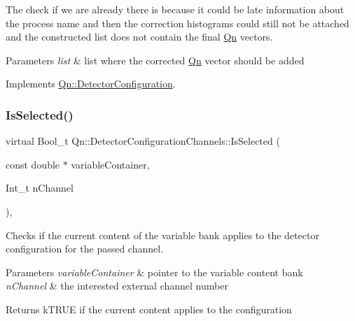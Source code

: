The check if we are already there is because it could be late information about the process name and then the correction histograms could still not be attached and the constructed list does not contain the final \mbox{\hyperlink{namespaceQn}{Qn}} vectors. 
\begin{DoxyParams}{Parameters}
{\em list} & list where the corrected \mbox{\hyperlink{namespaceQn}{Qn}} vector should be added \\
\hline
\end{DoxyParams}


Implements \mbox{\hyperlink{classQn_1_1DetectorConfiguration_a4298530954cc8dabbd41b1fd83d6310f}{Qn\+::\+Detector\+Configuration}}.

\mbox{\label{classQn_1_1DetectorConfigurationChannels_a45d03a27b4825709c2440a905ca8959a}} 
\subsubsection{\texorpdfstring{Is\+Selected()}{IsSelected()}}
{\footnotesize\ttfamily virtual Bool\+\_\+t Qn\+::\+Detector\+Configuration\+Channels\+::\+Is\+Selected (\begin{DoxyParamCaption}\item[{const double $\ast$}]{variable\+Container,  }\item[{Int\+\_\+t}]{n\+Channel }\end{DoxyParamCaption})\hspace{0.3cm}{\ttfamily [inline]}, {\ttfamily [virtual]}}

Checks if the current content of the variable bank applies to the detector configuration for the passed channel. 
\begin{DoxyParams}{Parameters}
{\em variable\+Container} & pointer to the variable content bank \\
\hline
{\em n\+Channel} & the interested external channel number \\
\hline
\end{DoxyParams}
\begin{DoxyReturn}{Returns}
k\+T\+R\+UE if the current content applies to the configuration 
\end{DoxyReturn}



